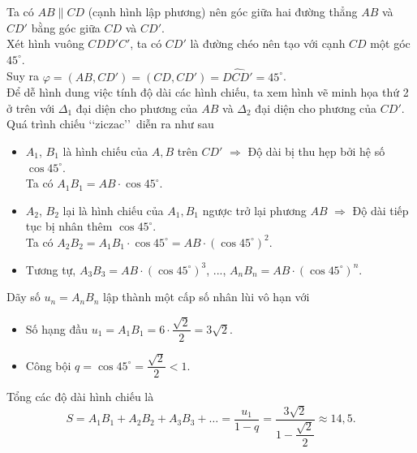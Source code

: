 \begin{ex}
{\begin{center}
		\end{center}
		\noindent
		Ta có $AB \parallel CD$ (cạnh hình lập phương) nên góc giữa hai đường thẳng $AB$ và $CD'$ bằng góc giữa $CD$ và $CD'$.\\
		Xét hình vuông $CDD'C'$, ta có $CD'$ là đường chéo nên tạo với cạnh $CD$ một góc $45^\circ$. \\
		Suy ra $\varphi = (AB,CD')=(CD,CD')= \widehat{DCD'} = 45^\circ$.\\
		Để dễ hình dung việc tính độ dài các hình chiếu, ta xem hình vẽ minh họa thứ 2 ở trên với $\Delta_1$ đại diện cho phương của $AB$ và $\Delta_2$ đại diện cho phương của $CD'$. Quá trình chiếu \lq\lq ziczac\rq\rq\ diễn ra như sau
		\begin{itemize}
			\item $A_1$, $B_1$ là hình chiếu của $A, B$ trên $CD'$ $\Rightarrow$ Độ dài bị thu hẹp bởi hệ số $\cos 45^\circ$. \\
			Ta có $A_1B_1 = AB \cdot \cos 45^\circ$.
			\item $A_2$, $B_2$ lại là hình chiếu của $A_1, B_1$ ngược trở lại phương $AB$ $\Rightarrow$ Độ dài tiếp tục bị nhân thêm $\cos 45^\circ$.\\
			Ta có $A_2B_2 = A_1B_1 \cdot \cos 45^\circ = AB \cdot (\cos 45^\circ)^2$.
			\item Tương tự, $A_3B_3 = AB \cdot (\cos 45^\circ)^3$, ..., $A_nB_n = AB \cdot (\cos 45^\circ)^n$.
		\end{itemize}
		Dãy số $u_n = A_n B_n$ lập thành một cấp số nhân lùi vô hạn với
		\begin{itemize}
			\item Số hạng đầu $u_1 = A_1B_1 = 6 \cdot \dfrac{\sqrt{2}}{2} = 3\sqrt{2}$.
			\item Công bội $q = \cos 45^\circ = \dfrac{\sqrt{2}}{2} < 1$.
		\end{itemize}
		Tổng các độ dài hình chiếu là
		\[S = A_1B_1 + A_2B_2 + A_3B_3 + \dots = \dfrac{u_1}{1-q} = \dfrac{3\sqrt{2}}{1-\dfrac{\sqrt{2}}{2}}\approx 14{,}5.\]
	}
\end{ex}

